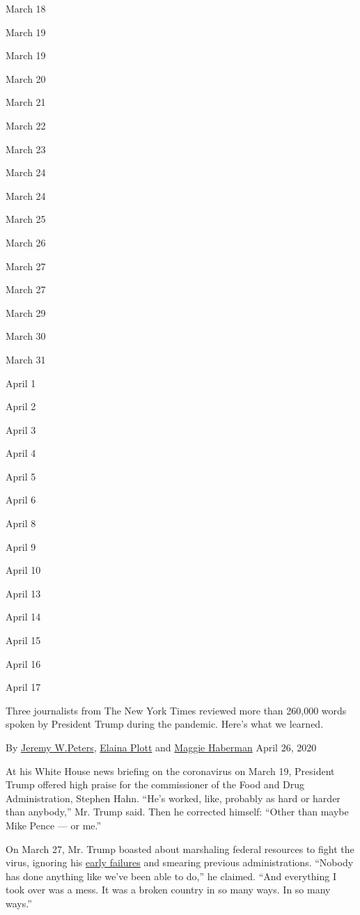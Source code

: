 March 18

March 19

March 19

March 20

March 21

March 22

March 23

March 24

March 24

March 25

March 26

March 27

March 27

March 29

March 30

March 31

April 1

April 2

April 3

April 4

April 5

April 6

April 8

April 9

April 10

April 13

April 14

April 15

April 16

April 17

Three journalists from The New York Times reviewed more than 260,000
words spoken by President Trump during the pandemic. Here's what we
learned.

 By \href{https://www.nytimes3xbfgragh.onion/by/jeremy-w-peters}{Jeremy
W}\href{https://www.nytimes3xbfgragh.onion/by/jeremy-w-peters}{.}\href{https://www.nytimes3xbfgragh.onion/by/jeremy-w-peters}{Peters},
\href{https://www.nytimes3xbfgragh.onion/by/elaina-plott}{Elaina Plott}
and \href{https://www.nytimes3xbfgragh.onion/by/maggie-haberman}{Maggie
Haberman} April 26, 2020

At his White House news briefing on the coronavirus on March 19,
President Trump offered high praise for the commissioner of the Food and
Drug Administration, Stephen Hahn. ``He's worked, like, probably as hard
or harder than anybody,'' Mr. Trump said. Then he corrected himself:
``Other than maybe Mike Pence --- or me.''

On March 27, Mr. Trump boasted about marshaling federal resources to
fight the virus, ignoring his
\href{https://www.nytimes3xbfgragh.onion/2020/04/11/us/politics/coronavirus-trump-response.html}{early
failures} and smearing previous administrations. ``Nobody has done
anything like we've been able to do,'' he claimed. ``And everything I
took over was a mess. It was a broken country in so many ways. In so
many ways.''

